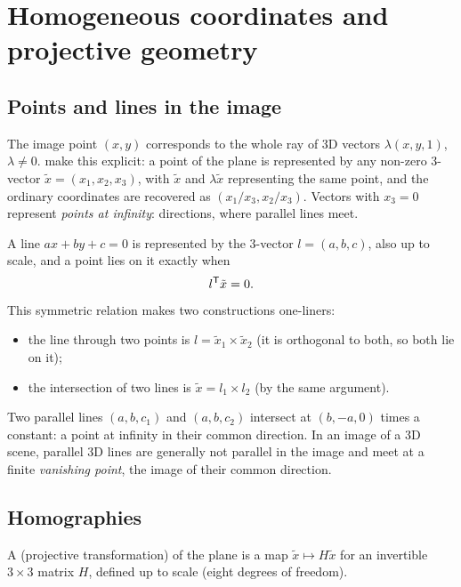 \section{Homogeneous coordinates and projective geometry}
\label{sec:homogeneous}

\subsection{Points and lines in the image}

The image point $(x, y)$ corresponds to the whole ray of 3D vectors $\lambda(x, y, 1)$, $\lambda \ne 0$.  make this explicit: a point of the
plane is represented by any non-zero 3-vector $\tilde x = (x_1, x_2, x_3)$, with $\tilde x$ and $\lambda\tilde x$ representing the same point, and the ordinary coordinates
are recovered as $(x_1/x_3, x_2/x_3)$. Vectors with $x_3 = 0$ represent \emph{points at infinity}: directions, where parallel lines meet.

A line $ax + by + c = 0$ is represented by the 3-vector $l = (a, b, c)$, also up to scale, and a point lies on it exactly when
\begin{equation}
  l^{\mathsf{T}}\tilde x = 0 .
\end{equation}
This symmetric relation makes two constructions one-liners:
\begin{itemize}
  \item the line through two points is $l = \tilde x_1\times\tilde x_2$ (it is orthogonal to both, so both lie on it);
  \item the intersection of two lines is $\tilde x = l_1\times l_2$ (by the same argument).
\end{itemize}
Two parallel lines $(a, b, c_1)$ and $(a, b, c_2)$ intersect at $(b, -a, 0)$ times a constant: a point at infinity in their common direction. In an image of a
3D scene, parallel 3D lines are generally not parallel in the image and meet at a finite \emph{vanishing point}, the image of their common direction.

\subsection{Homographies}

\begin{definition}[Homography]
A  (projective transformation) of the plane is a map $\tilde x \mapsto H\tilde x$ for an invertible $3\times3$ matrix $H$, defined up to scale (eight
degrees of freedom).
\end{definition}

